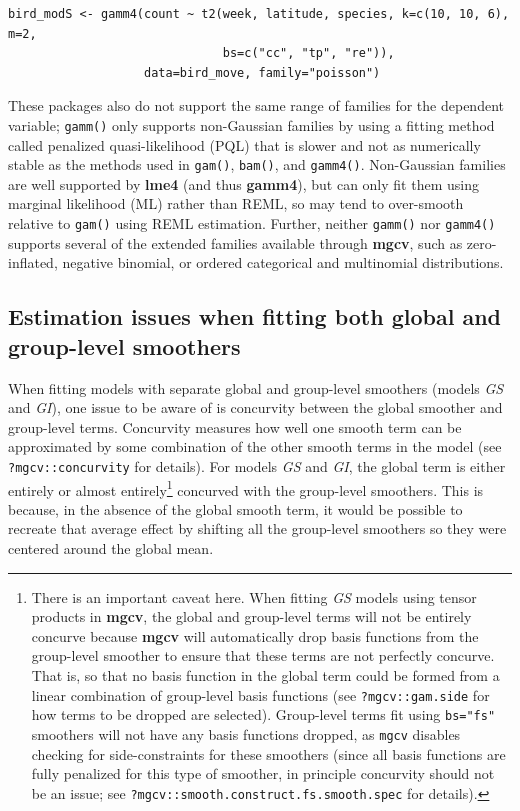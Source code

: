 \documentclass[12pt]{article}
\let\rmarkdownfootnote\footnote%
\def\footnote{\protect\rmarkdownfootnote}
\begin{document}
\begin{verbatim}
bird_modS <- gamm4(count ~ t2(week, latitude, species, k=c(10, 10, 6), m=2,
                              bs=c("cc", "tp", "re")),
                   data=bird_move, family="poisson")
\end{verbatim}

These packages also do not support the same range of families for the
dependent variable; \texttt{gamm()} only supports non-Gaussian families
by using a fitting method called penalized quasi-likelihood (PQL) that
is slower and not as numerically stable as the methods used in
\texttt{gam()}, \texttt{bam()}, and \texttt{gamm4()}. Non-Gaussian
families are well supported by \textbf{lme4} (and thus \textbf{gamm4}),
but can only fit them using marginal likelihood (ML) rather than REML,
so may tend to over-smooth relative to \texttt{gam()} using REML
estimation. Further, neither \texttt{gamm()} nor \texttt{gamm4()}
supports several of the extended families available through
\textbf{mgcv}, such as zero-inflated, negative binomial, or ordered
categorical and multinomial distributions.

\subsection{Estimation issues when fitting both global and group-level
smoothers}\label{estimation-issues-when-fitting-both-global-and-group-level-smoothers}

When fitting models with separate global and group-level smoothers
(models \emph{GS} and \emph{GI}), one issue to be aware of is concurvity
between the global smoother and group-level terms. Concurvity measures
how well one smooth term can be approximated by some combination of the
other smooth terms in the model (see \texttt{?mgcv::concurvity} for
details). For models \emph{GS} and \emph{GI}, the global term is either
entirely or almost entirely\footnote{There is an important caveat here.
  When fitting \emph{GS} models using tensor products in \textbf{mgcv},
  the global and group-level terms will not be entirely concurve because
  \textbf{mgcv} will automatically drop basis functions from the
  group-level smoother to ensure that these terms are not perfectly
  concurve. That is, so that no basis function in the global term could
  be formed from a linear combination of group-level basis functions
  (see \texttt{?mgcv::gam.side} for how terms to be dropped are
  selected). Group-level terms fit using \texttt{bs="fs"} smoothers will
  not have any basis functions dropped, as \texttt{mgcv} disables
  checking for side-constraints for these smoothers (since all basis
  functions are fully penalized for this type of smoother, in principle
  concurvity should not be an issue; see
  \texttt{?mgcv::smooth.construct.fs.smooth.spec} for details).}
concurved with the group-level smoothers. This is because, in the
absence of the global smooth term, it would be possible to recreate that
average effect by shifting all the group-level smoothers so they were
centered around the global mean.
\end{document}
